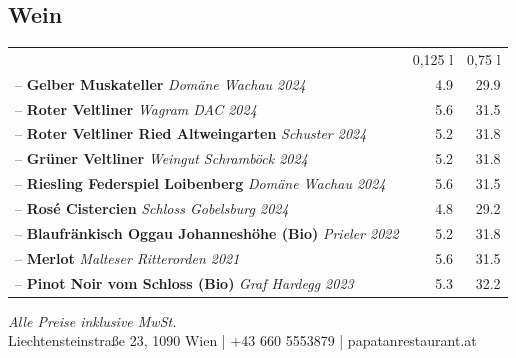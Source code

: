 \documentclass[a4paper,12pt]{article}
\begin{document}
\begin{multicols}{2}
\section*{Wein}
\begin{tabular}{Lrr}
& 0,125 l & 0,75 l\\
-- \textbf{Gelber Muskateller} \emph{Domäne Wachau 2024} & 4.9 & 29.9\\
-- \textbf{Roter Veltliner} \emph{Wagram DAC 2024} & 5.6 & 31.5\\
-- \textbf{Roter Veltliner Ried Altweingarten} \emph{Schuster 2024} & 5.2 & 31.8\\
-- \textbf{Grüner Veltliner} \emph{Weingut Schramböck 2024} & 5.2 & 31.8\\
-- \textbf{Riesling Federspiel Loibenberg} \emph{Domäne Wachau 2024} & 5.6 & 31.5\\
-- \textbf{Rosé Cistercien} \emph{Schloss Gobelsburg 2024} & 4.8 & 29.2\\
-- \textbf{Blaufränkisch Oggau Johanneshöhe (Bio)} \emph{Prieler 2022} & 5.2 & 31.8\\
-- \textbf{Merlot} \emph{Malteser Ritterorden 2021} & 5.6 & 31.5\\
-- \textbf{Pinot Noir vom Schloss (Bio)} \emph{Graf Hardegg 2023} & 5.3 & 32.2
\end{tabular}

\end{multicols}

\vfill
\begin{center}
    {\small \textit{Alle Preise inklusive MwSt.}}\\
    {\small Liechtensteinstraße 23, 1090 Wien \quad | \quad +43 660 5553879 \quad | \quad papatanrestaurant.at}
\end{center}

\newpage

\end{document}
